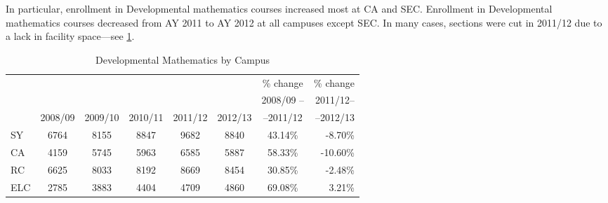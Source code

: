 In particular, enrollment in Developmental mathematics courses increased most
at CA and SEC. Enrollment in Developmental mathematics courses
decreased from AY 2011 to AY 2012 at all campuses except SEC. In many cases,
sections were cut in 2011/12 due to a lack in facility space---see
\cref{needs:tab:enrollmentDevelp}. 



\begin{table}[!htb]
	\caption{Developmental Mathematics by Campus}
	\label{needs:tab:enrollmentDevelp}
	\begin{tabular}{l*{6}{c}r}
		\toprule
		    &        &        &        &        &        & \% change & \% change \\
		    &		&	&	&	&	&2008/09 --	&2011/12--\\
		    & 2008/09 & 2009/10 & 2010/11 & 2011/12 & 2012/13 & --2011/12 &--2012/13 \\
		\midrule
		SY  & 6764   & 8155   & 8847   & 9682   & 8840   & 43.14\%   & -8.70\%   \\
		CA  & 4159   & 5745   & 5963   & 6585   & 5887   & 58.33\%   & -10.60\%  \\
		RC  & 6625   & 8033   & 8192   & 8669   & 8454   & 30.85\%   & -2.48\%   \\
		ELC & 2785   & 3883   & 4404   & 4709   & 4860   & 69.08\%   & 3.21\%    \\
		\bottomrule
	\end{tabular}
\end{table}

